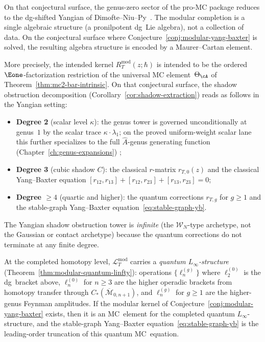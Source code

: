 \begin{remark}
\label{rem:modular-yangian-chriss-ginzburg}
On that conjectural surface, the genus-zero sector of the pro-MC
package reduces to the dg-shifted Yangian of
Dimofte--Niu--Py~\cite{DNP25}. The modular
completion is a single algebraic structure (a pronilpotent
dg~Lie algebra), not a collection of data. On the conjectural
surface where Conjecture~\ref{conj:modular-yang-baxter} is solved,
the resulting algebra structure is encoded by a Maurer--Cartan
element.

More precisely, the intended kernel
$R_T^{\mathrm{mod}}(z;\hbar)$ is intended to be the ordered
$\Eone$-factorization restriction of the universal MC
element~$\Theta_\cA$ of Theorem~\ref{thm:mc2-bar-intrinsic}. On that
conjectural surface, the
shadow obstruction decomposition
(Corollary~\ref{cor:shadow-extraction}) reads as follows in the
Yangian setting:
\begin{itemize}
\item \textbf{Degree 2} (scalar level $\kappa$): the genus tower
 is governed unconditionally at genus~$1$ by the scalar trace
 $\kappa \cdot \lambda_1$; on the proved uniform-weight scalar lane
 this further specializes to the full $\hat{A}$-genus generating
 function \ifannalsedition\else
(Chapter~\ref{ch:genus-expansions})
\fi;
\item \textbf{Degree 3} (cubic shadow $C$): the classical
 $r$-matrix $r_{T,0}(z)$ and the classical Yang--Baxter equation
 $[r_{12}, r_{13}] + [r_{12}, r_{23}] + [r_{13}, r_{23}] = 0$;
\item \textbf{Degree $\geq 4$} (quartic and higher): the quantum
 corrections $r_{T,g}$ for $g \geq 1$ and the stable-graph
 Yang--Baxter equation~\eqref{eq:stable-graph-yb}.
\end{itemize}
The Yangian shadow obstruction tower is \emph{infinite} (the $\mathcal{W}_N$-type
archetype, not the Gaussian or contact archetype) because the quantum
corrections do not terminate at any finite degree.

At the completed homotopy level, $\mathcal{L}_T^{\mathrm{mod}}$ carries
a \emph{quantum $L_\infty$-structure}
(Theorem~\ref{thm:modular-quantum-linfty}): operations
$\{\ell_n^{(g)}\}$ where $\ell_2^{(0)}$ is the dg~bracket above,
$\ell_n^{(0)}$ for $n \geq 3$ are the higher operadic brackets from
homotopy transfer through
$C_*(\overline{\mathcal{M}}_{0,n+1})$, and $\ell_n^{(g)}$ for
$g \geq 1$ are the higher-genus Feynman amplitudes. If the modular
kernel of Conjecture~\ref{conj:modular-yang-baxter} exists, then it is
an MC~element for the completed quantum $L_\infty$-structure, and the
stable-graph Yang--Baxter
equation~\eqref{eq:stable-graph-yb} is the leading-order truncation
of this quantum MC~equation.
\end{remark}

